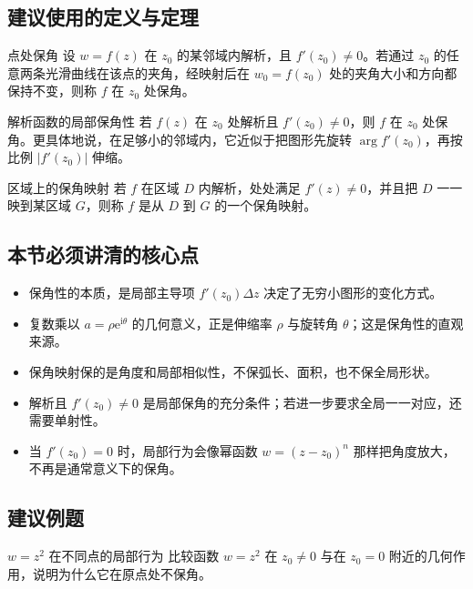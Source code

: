 \subsection*{建议使用的定义与定理}
\begin{dingliyi}{点处保角}{}
设 $w=f(z)$ 在 $z_0$ 的某邻域内解析，且 $f'(z_0)\neq 0$。若通过 $z_0$ 的任意两条光滑曲线在该点的夹角，经映射后在 $w_0=f(z_0)$ 处的夹角大小和方向都保持不变，则称 $f$ 在 $z_0$ 处保角。
\end{dingliyi}

\begin{dingli}{解析函数的局部保角性}{}
若 $f(z)$ 在 $z_0$ 处解析且 $f'(z_0)\neq 0$，则 $f$ 在 $z_0$ 处保角。更具体地说，在足够小的邻域内，它近似于把图形先旋转 $\arg f'(z_0)$，再按比例 $|f'(z_0)|$ 伸缩。
\end{dingli}

\begin{dingliyi}{区域上的保角映射}{}
若 $f$ 在区域 $D$ 内解析，处处满足 $f'(z)\neq 0$，并且把 $D$ 一一映到某区域 $G$，则称 $f$ 是从 $D$ 到 $G$ 的一个保角映射。
\end{dingliyi}

\subsection*{本节必须讲清的核心点}
\begin{itemize}
    \item 保角性的本质，是局部主导项 $f'(z_0)\Delta z$ 决定了无穷小图形的变化方式。
    \item 复数乘以 $a=\rho \mathrm{e}^{\mathrm{i}\theta}$ 的几何意义，正是伸缩率 $\rho$ 与旋转角 $\theta$；这是保角性的直观来源。
    \item 保角映射保的是角度和局部相似性，不保弧长、面积，也不保全局形状。
    \item 解析且 $f'(z_0)\neq 0$ 是局部保角的充分条件；若进一步要求全局一一对应，还需要单射性。
    \item 当 $f'(z_0)=0$ 时，局部行为会像幂函数 $w=(z-z_0)^n$ 那样把角度放大，不再是通常意义下的保角。
\end{itemize}

\subsection*{建议例题}
\begin{lizi}{$w=z^2$ 在不同点的局部行为}{}
比较函数 $w=z^2$ 在 $z_0\neq 0$ 与在 $z_0=0$ 附近的几何作用，说明为什么它在原点处不保角。
\end{lizi}

